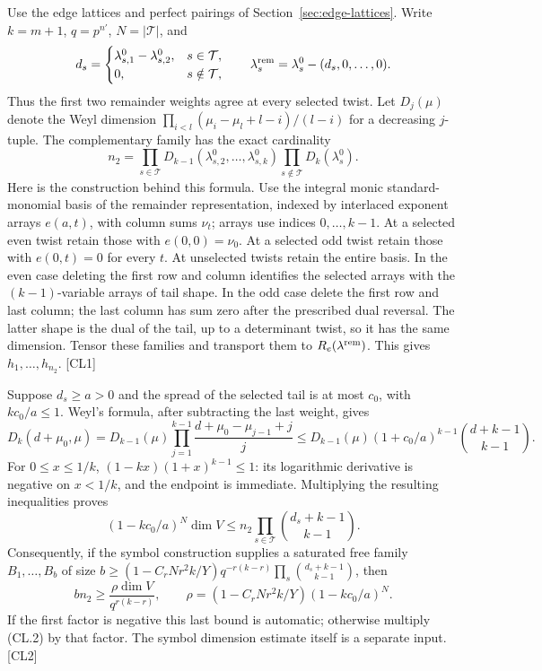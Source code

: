 \documentclass[11pt,a4paper]{article}
\numberwithin{equation}{section}
\theoremstyle{remark}\newtheorem{remark}[theorem]{Remark}
\begin{document}
Use the edge lattices and perfect pairings of Section~\ref{sec:edge-lattices}. Write $k=m+1$, $q=p^{n'}$, $N=|\mathcal T|$, and
\[
 d_s=\begin{cases}\lambda^0_{s,1}-\lambda^0_{s,2},&s\in\mathcal T,\\0,&s\notin\mathcal T,\end{cases}
 \qquad \lambda^{\rm rem}_s=\lambda^0_s-(d_s,0,\ldots,0).
\]
Thus the first two remainder weights agree at every selected twist. Let $D_j(\mu)$ denote the Weyl dimension
$\prod_{i<l}(\mu_i-\mu_l+l-i)/(l-i)$ for a decreasing $j$-tuple. The complementary family has the exact cardinality
\[
 n_2=\prod_{s\in\mathcal T}D_{k-1}(\lambda^0_{s,2},\ldots,\lambda^0_{s,k})
       \prod_{s\notin\mathcal T}D_k(\lambda^0_s).
 \tag{CL.1}\label{eq:cl-count}
\]
Here is the construction behind this formula. Use the integral monic standard-monomial basis of the remainder representation, indexed by interlaced exponent arrays $e(a,t)$, with column sums $\nu_t$; arrays use indices $0,\ldots,k-1$. At a selected even twist retain those with $e(0,0)=\nu_0$. At a selected odd twist retain those with $e(0,t)=0$ for every $t$. At unselected twists retain the entire basis. In the even case deleting the first row and column identifies the selected arrays with the $(k-1)$-variable arrays of tail shape. In the odd case delete the first row and last column; the last column has sum zero after the prescribed dual reversal. The latter shape is the dual of the tail, up to a determinant twist, so it has the same dimension. Tensor these families and transport them to $R_e(\lambda^{\rm rem})$. This gives $h_1,\ldots,h_{n_2}$. \textsf{[CL1]}\cite{cloud-construction,cloud-flat}

Suppose $d_s\ge a>0$ and the spread of the selected tail is at most $c_0$, with $kc_0/a\le1$. Weyl's formula, after subtracting the last weight, gives
\[
 D_k(d+\mu_0,\mu)
 =D_{k-1}(\mu)\prod_{j=1}^{k-1}\frac{d+\mu_0-\mu_{j-1}+j}{j}
 \le D_{k-1}(\mu)(1+c_0/a)^{k-1}\binom{d+k-1}{k-1}.
\]
For $0\le x\le1/k$, $(1-kx)(1+x)^{k-1}\le1$: its logarithmic derivative is negative on $x<1/k$, and the endpoint is immediate. Multiplying the resulting inequalities proves
\[
 (1-kc_0/a)^N\dim V
 \le n_2\prod_{s\in\mathcal T}\binom{d_s+k-1}{k-1}.
 \tag{CL.2}\label{eq:cl-weyl}
\]
Consequently, if the symbol construction supplies a saturated free family $B_1,\ldots,B_b$ of size
$b\ge(1-C_rNr^2k/Y)q^{-r(k-r)}\prod_s\binom{d_s+k-1}{k-1}$, then
\[
 bn_2\ge\frac{\rho\dim V}{q^{r(k-r)}},\qquad
 \rho=(1-C_rNr^2k/Y)(1-kc_0/a)^N.
 \tag{CL.3}
\]
If the first factor is negative this last bound is automatic; otherwise multiply (CL.2) by that factor. The symbol dimension estimate itself is a separate input. \textsf{[CL2]}
\end{document}
